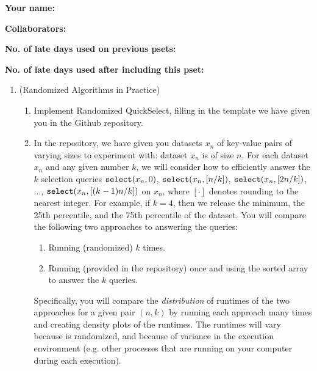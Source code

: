 \documentclass[11pt]{article}
\begin{document}

\textbf{Your name: }

\textbf{Collaborators: }

\textbf{No. of late days used on previous psets: }

\textbf{No. of late days used after including this pset: }

\begin{enumerate}
    \item (Randomized Algorithms in Practice)  
    \begin{enumerate}
        \item Implement Randomized QuickSelect, filling in the template we have given you in the Github repository.
        
        \item 
        In the repository, we have given you datasets $x_n$ of key-value pairs of varying sizes to experiment with: dataset $x_n$ is of size $n$.  For each dataset $x_n$ and any given number $k$, we will consider how to efficiently answer the $k$ selection queries
        $\texttt{select}(x_n,0)$, $\texttt{select}(x_n,[n/k])$, $\texttt{select}(x_n,[2n/k])$, $\ldots$, $\texttt{select}(x_n,[(k-1)n/k])$ on $x_n$, where $[\cdot]$ denotes rounding to the nearest integer. For example, if $k=4$, then we release the minimum, the 25th percentile, and the 75th percentile of the dataset.  You will compare the following two approaches to answering the queries:
        
        \begin{enumerate}
            \item Running (randomized) \QuickSelect{} $k$ times.
            \item Running \MergeSort{} (provided in the repository) once and using the sorted array to answer the $k$ queries.
        \end{enumerate}
        Specifically, you will compare the {\em distribution} of runtimes of the two approaches for a given pair $(n,k)$ by running each approach many times and creating density plots of the runtimes.  The runtimes will vary because \QuickSelect{}  is randomized, and because of variance in the execution environment (e.g. other processes that are running on your computer during each execution). \vspace{1.5mm}
        

\end{enumerate}
\end{enumerate}
\end{document}
